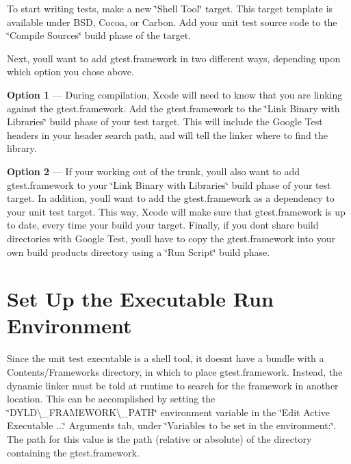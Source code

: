 To start writing tests, make a new \char`\"{}\+Shell Tool\char`\"{} target. This target template is available under B\+SD, Cocoa, or Carbon. Add your unit test source code to the \char`\"{}\+Compile Sources\char`\"{} build phase of the target.

Next, you\textquotesingle{}ll want to add gtest.\+framework in two different ways, depending upon which option you chose above.


\begin{DoxyItemize}
\item {\bfseries Option 1} --- During compilation, Xcode will need to know that you are linking against the gtest.\+framework. Add the gtest.\+framework to the \char`\"{}\+Link Binary with Libraries\char`\"{} build phase of your test target. This will include the Google Test headers in your header search path, and will tell the linker where to find the library.
\item {\bfseries Option 2} --- If your working out of the trunk, you\textquotesingle{}ll also want to add gtest.\+framework to your \char`\"{}\+Link Binary with Libraries\char`\"{} build phase of your test target. In addition, you\textquotesingle{}ll want to add the gtest.\+framework as a dependency to your unit test target. This way, Xcode will make sure that gtest.\+framework is up to date, every time your build your target. Finally, if you don\textquotesingle{}t share build directories with Google Test, you\textquotesingle{}ll have to copy the gtest.\+framework into your own build products directory using a \char`\"{}\+Run Script\char`\"{} build phase.
\end{DoxyItemize}

\section*{Set Up the Executable Run Environment}

Since the unit test executable is a shell tool, it doesn\textquotesingle{}t have a bundle with a {\ttfamily Contents/\+Frameworks} directory, in which to place gtest.\+framework. Instead, the dynamic linker must be told at runtime to search for the framework in another location. This can be accomplished by setting the \char`\"{}\+D\+Y\+L\+D\textbackslash{}\+\_\+\+F\+R\+A\+M\+E\+W\+O\+R\+K\textbackslash{}\+\_\+\+P\+A\+T\+H\char`\"{} environment variable in the \char`\"{}\+Edit Active Executable ...\char`\"{} Arguments tab, under \char`\"{}\+Variables to be set in the environment\+:\char`\"{}. The path for this value is the path (relative or absolute) of the directory containing the gtest.\+framework.


